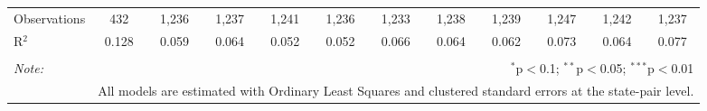 \begin{table}[!htbp]
\begin{tabular}{@{\extracolsep{5pt}}lccccccccccc}
Observations & 432 & 1,236 & 1,237 & 1,241 & 1,236 & 1,233 & 1,238 & 1,239 & 1,247 & 1,242 & 1,237 \\ 
R$^{2}$ & 0.128 & 0.059 & 0.064 & 0.052 & 0.052 & 0.066 & 0.064 & 0.062 & 0.073 & 0.064 & 0.077 \\ 
\hline 
\hline \\[-1.8ex] 
\textit{Note:}  & \multicolumn{11}{r}{$^{*}$p$<$0.1; $^{**}$p$<$0.05; $^{***}$p$<$0.01} \\ 
 & \multicolumn{11}{r}{All models are estimated with Ordinary Least Squares and clustered standard errors at the state-pair level.} \\ 
\end{tabular} 
\end{table} 
